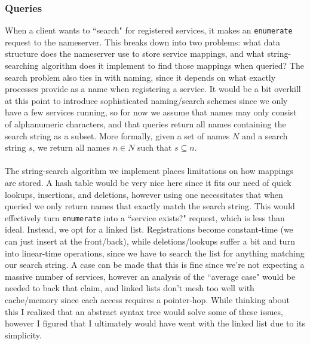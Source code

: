 \subsubsection{Queries}
When a client wants to ``search" for registered services, it makes an \texttt{enumerate} request to the nameserver. This breaks down into two problems: what data structure does the nameserver use to store service mappings, and what string-searching algorithm does it implement to find those mappings when queried? The search problem also ties in with naming, since it depends on what exactly processes provide as a name when registering a service. It would be a bit overkill at this point to introduce sophisticated naming/search schemes since we only have a few services running, so for now we assume that names may only consist of alphanumeric characters, and that queries return all names containing the search string as a subset. More formally, given a set of names $N$ and a search string $s$, we return all names $n \in N$ such that $s \subseteq n$.
\\\\
The string-search algorithm we implement places limitations on how mappings are stored. A hash table would be very nice here since it fits our need of quick lookups, insertions, and deletions, however using one necessitates that when queried we only return names that exactly match the search string. This would effectively turn \texttt{enumerate} into a ``service exists?" request, which is less than ideal. Instead, we opt for a linked list. Registrations become constant-time (we can just insert at the front/back), while deletions/lookups suffer a bit and turn into linear-time operations, since we have to search the list for anything matching our search string. A case can be made that this is fine since we're not expecting a massive number of services, however an analysis of the ``average case" would be needed to back that claim, and linked lists don't mesh too well with cache/memory since each access requires a pointer-hop. While thinking about this I realized that an abstract syntax tree would solve some of these issues, however I figured that I ultimately would have went with the linked list due to its simplicity.

